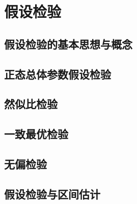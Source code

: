 \chapter{假设检验}

\section{假设检验的基本思想与概念}

\section{正态总体参数假设检验}

\section{然似比检验}

\section{一致最优检验}

\section{无偏检验}

\section{假设检验与区间估计}
